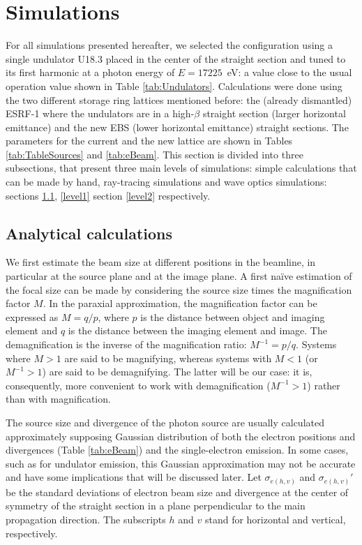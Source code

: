 \documentclass{iucr}              %
\begin{document}
\section{Simulations}
\label{Simulations}

For all simulations presented hereafter, we selected the configuration using a single undulator U18.3 placed in the center of the straight section and tuned to its first harmonic at a photon energy of $E=17225$~eV: a value close to the usual operation value shown in Table \ref{tab:Undulators}. Calculations were done using the two different storage ring lattices mentioned before: the (already dismantled) ESRF-1 where the undulators are in a high-$\beta$ straight section (larger horizontal emittance) and the new EBS (lower horizontal emittance) straight sections. The parameters for the current and the new lattice are shown in Tables \ref{tab:TableSources} and \ref{tab:eBeam}.
This section is divided into three subsections, that present three main levels of simulations: simple calculations that can be made by hand, ray-tracing simulations and wave optics simulations: sections  \ref{level0}, \ref{level1} section \ref{level2} respectively.   

\subsection{Analytical calculations}
\label{level0}

We first estimate the beam size at different positions in the beamline, in particular at the source plane and at the image plane. A first na{\"{i}}ve estimation of the focal size can be made by considering the source size times the magnification factor $M$. In the paraxial approximation, the magnification factor can be expressed as $M=q/p$, where $p$ is the distance between object and imaging element and $q$ is the distance between the imaging element and image. The demagnification is the inverse of the magnification ratio: $M^{-1}=p/q$. Systems where $M>1$ are said to be magnifying, whereas systems with $M<1$ (or $M^{-1}>1$) are said to be demagnifying. The latter will be our case: it is, consequently, more convenient to work with demagnification ($M^{-1}>1$) rather than with magnification. 

The source size and divergence of the photon source are usually calculated approximately supposing Gaussian distribution of both the electron positions and divergences (Table \ref{tab:eBeam}) and the single-electron emission. In some cases, such as for undulator emission, this Gaussian approximation may not be accurate and have some implications that will be discussed later. Let $\sigma_{e(h,v)}$ and $\sigma_{e(h,v)}'$ be the standard deviations of electron beam size and divergence at the center of symmetry of the straight section in a plane perpendicular to the main propagation direction. The subscripts $h$ and $v$ stand for horizontal and vertical, respectively. 
\end{document}
